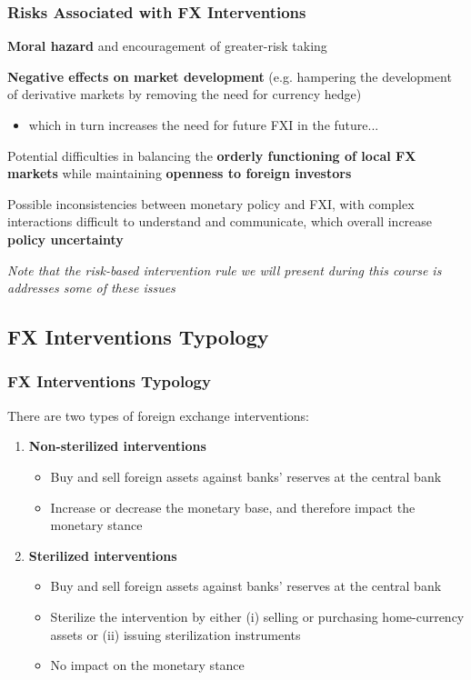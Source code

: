 \documentclass{beamer}
\newenvironment{wideitemize}{\itemize\addtolength{\itemsep}{10pt}}{\enditemize}
\begin{document}
\begin{frame}
  \frametitle{Risks Associated with FX Interventions}
  \begin{wideitemize}
    \item \textbf{Moral hazard} and encouragement of greater-risk taking
    \item \textbf{Negative effects on market development} (e.g. hampering the development of derivative markets by removing the need for currency hedge)
      \begin{itemize}
      \item which in turn increases the need for future FXI in the future...
      \end{itemize}
    \item Potential difficulties in balancing the \textbf{orderly functioning of local FX markets} while maintaining \textbf{openness to foreign investors}
    \item Possible inconsistencies between monetary policy and FXI, with complex interactions difficult to understand and communicate, which overall increase \textbf{policy uncertainty}
    \item \emph{Note that the risk-based intervention rule we will present during this course is addresses some of these issues}
  \end{wideitemize}
\end{frame}



\subsection{FX Interventions Typology}
\begin{frame}
  \frametitle{FX Interventions Typology}
  
  There are two types of foreign exchange interventions:\\
  \medskip

  \begin{enumerate}
  \item \textbf{Non-sterilized interventions}
    \begin{itemize}
    \item Buy and sell foreign assets against banks' reserves at the central bank
    \item Increase or decrease the monetary base, and therefore impact the monetary stance
    \end{itemize}
  \item \textbf{Sterilized interventions}
    \begin{itemize}
    \item Buy and sell foreign assets against banks' reserves at the central bank
    \item Sterilize the intervention by either (i) selling or purchasing home-currency assets or (ii) issuing sterilization instruments 
    \item No impact on the monetary stance
    \end{itemize}
  \end{enumerate}
\end{frame}
\end{document}
